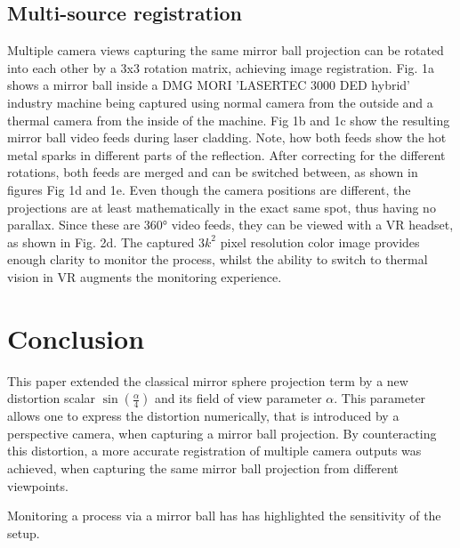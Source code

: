 \documentclass[10pt]{article}
\begin{document}
\begin{multicols}{2}
 \subsection{Multi-source registration}
 Multiple camera views capturing the same mirror ball projection can be rotated into each other by a 3x3 rotation matrix, achieving image registration. Fig. 1a shows a mirror ball inside a DMG MORI 'LASERTEC 3000 DED hybrid' industry machine being captured using normal camera from the outside and a thermal camera from the inside of the machine. Fig 1b and 1c show the resulting mirror ball video feeds during laser cladding. Note, how both feeds show the hot metal sparks in different parts of the reflection. After correcting for the different rotations, both feeds are merged and can be switched between, as shown in figures Fig 1d and 1e. Even though the camera positions are different, the projections are at least mathematically in the exact same spot, thus having no parallax. Since these are 360° video feeds, they can be viewed with a VR headset, as shown in Fig. 2d. The captured $3k^2$ pixel resolution color image provides enough clarity to monitor the process, whilst the ability to switch to thermal vision in VR augments the monitoring experience.

\section{Conclusion}
This paper extended the classical mirror sphere projection term by a new distortion scalar $\sin{\left(\frac{\alpha}{4}\right)}$ and its field of view parameter $\alpha$. This parameter allows one to express the distortion numerically, that is introduced by a perspective camera, when capturing a mirror ball projection. By counteracting this distortion, a more accurate registration of multiple camera outputs was achieved, when capturing the same mirror ball projection from different viewpoints.

Monitoring a process via a mirror ball has has highlighted the sensitivity of the setup.


\end{multicols}
\end{document}

